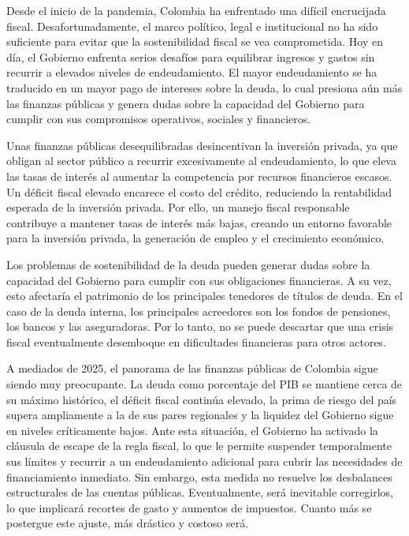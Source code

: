 
\begin{preface}

Desde el inicio de la pandemia, Colombia ha enfrentado una difícil encrucijada fiscal. Desafortunadamente, el marco político, legal e institucional no ha sido suficiente para evitar que la sostenibilidad fiscal se vea comprometida. Hoy en día, el Gobierno enfrenta serios desafíos para equilibrar ingresos y gastos sin recurrir a elevados niveles de endeudamiento. El mayor endeudamiento se ha traducido en un mayor pago de intereses sobre la deuda, lo cual presiona aún más las finanzas públicas y genera dudas sobre la capacidad del Gobierno para cumplir con sus compromisos operativos, sociales y financieros.

Unas finanzas públicas desequilibradas desincentivan la inversión privada, ya que obligan al sector público a recurrir excesivamente al endeudamiento, lo que eleva las tasas de interés al aumentar la competencia por recursos financieros escasos. Un déficit fiscal elevado encarece el costo del crédito, reduciendo la rentabilidad esperada de la inversión privada. Por ello, un manejo fiscal responsable contribuye a mantener tasas de interés más bajas, creando un entorno favorable para la inversión privada, la generación de empleo y el crecimiento económico.

Los problemas de sostenibilidad de la deuda pueden generar dudas sobre la capacidad del Gobierno para cumplir con sus obligaciones financieras. A su vez, esto afectaría el patrimonio de los principales tenedores de títulos de deuda. En el caso de la deuda interna, los principales acreedores son los fondos de pensiones, los bancos y las aseguradoras. Por lo tanto, no se puede descartar que una crisis fiscal eventualmente desemboque en dificultades financieras para otros actores.

A mediados de 2025, el panorama de las finanzas públicas de Colombia sigue siendo muy preocupante. La deuda como porcentaje del PIB se mantiene cerca de su máximo histórico, el déficit fiscal continúa elevado, la prima de riesgo del país supera ampliamente a la de sus pares regionales y la liquidez del Gobierno sigue en niveles críticamente bajos. Ante esta situación, el Gobierno ha activado la cláusula de escape de la regla fiscal, lo que le permite suspender temporalmente sus límites y recurrir a un endeudamiento adicional para cubrir las necesidades de financiamiento inmediato. Sin embargo, esta medida no resuelve los desbalances estructurales de las cuentas públicas. Eventualmente, será inevitable corregirlos, lo que implicará recortes de gasto y aumentos de impuestos. Cuanto más se postergue este ajuste, más drástico y costoso será.


\end{preface}

